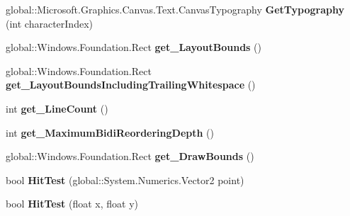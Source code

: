 \begin{DoxyCompactItemize}
global\+::\+Microsoft.\+Graphics.\+Canvas.\+Text.\+Canvas\+Typography {\bfseries Get\+Typography} (int character\+Index)
\item 
\mbox{\label{class_microsoft_1_1_graphics_1_1_canvas_1_1_text_1_1_canvas_text_layout_a772111b2573293b7d5a75e8d2396d598}} 
global\+::\+Windows.\+Foundation.\+Rect {\bfseries get\+\_\+\+Layout\+Bounds} ()
\item 
\mbox{\label{class_microsoft_1_1_graphics_1_1_canvas_1_1_text_1_1_canvas_text_layout_abce87ca208bfa0993ebbf52d11a81671}} 
global\+::\+Windows.\+Foundation.\+Rect {\bfseries get\+\_\+\+Layout\+Bounds\+Including\+Trailing\+Whitespace} ()
\item 
\mbox{\label{class_microsoft_1_1_graphics_1_1_canvas_1_1_text_1_1_canvas_text_layout_ada71c45dac02cdac6f56799104455aa5}} 
int {\bfseries get\+\_\+\+Line\+Count} ()
\item 
\mbox{\label{class_microsoft_1_1_graphics_1_1_canvas_1_1_text_1_1_canvas_text_layout_aac362a9384d9d8fa5cf235e2f129c939}} 
int {\bfseries get\+\_\+\+Maximum\+Bidi\+Reordering\+Depth} ()
\item 
\mbox{\label{class_microsoft_1_1_graphics_1_1_canvas_1_1_text_1_1_canvas_text_layout_a5230b0750a39afe10eab8898a0e65f82}} 
global\+::\+Windows.\+Foundation.\+Rect {\bfseries get\+\_\+\+Draw\+Bounds} ()
\item 
\mbox{\label{class_microsoft_1_1_graphics_1_1_canvas_1_1_text_1_1_canvas_text_layout_a096ba89ae4dafe4d7af99c68f87facb2}} 
bool {\bfseries Hit\+Test} (global\+::\+System.\+Numerics.\+Vector2 point)
\item 
\mbox{\label{class_microsoft_1_1_graphics_1_1_canvas_1_1_text_1_1_canvas_text_layout_abe577fdf1f6c6ac76801fb8eee342738}} 
bool {\bfseries Hit\+Test} (float x, float y)

\end{DoxyCompactItemize}
